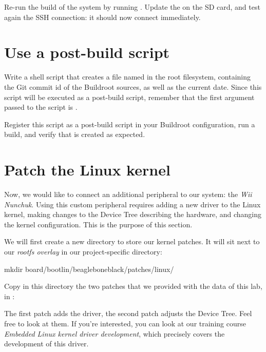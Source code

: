 Re-run the build of the system by running . Update the
 on the SD card, and test again the SSH connection: it
should now connect immediately.

\section{Use a post-build script}

Write a shell script that creates a file named  in
the root filesystem, containing the Git commit id of the Buildroot
sources, as well as the current date. Since this script will be
executed as a post-build script, remember that the first argument
passed to the script is .

Register this script as a post-build script in your Buildroot
configuration, run a build, and verify that  is
created as expected.

\section{Patch the Linux kernel}

Now, we would like to connect an additional peripheral to our system:
the {\em Wii Nunchuk}. Using this custom peripheral requires adding a
new driver to the Linux kernel, making changes to the Device Tree
describing the hardware, and changing the kernel configuration. This
is the purpose of this section.

We will first create a new directory to store our kernel patches. It
will sit next to our {\em rootfs overlay} in our project-specific
directory:

\begin{bashinput}
mkdir board/bootlin/beagleboneblack/patches/linux/
\end{bashinput}

Copy in this directory the two patches that we provided with the data
of this lab, in :


The first patch adds the driver, the second patch adjusts the Device
Tree. Feel free to look at them. If you're interested, you can look at
our training course {\em Embedded Linux kernel driver development},
which precisely covers the development of this driver.

